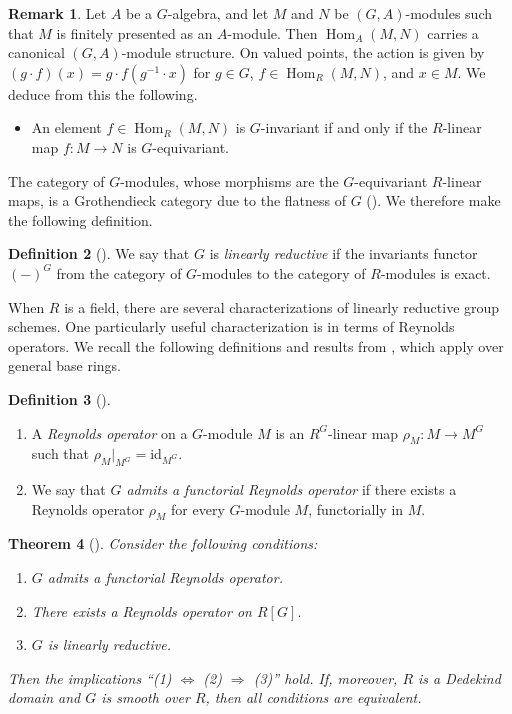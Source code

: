 \documentclass[uplatex,11pt,a4paper]{amsart} %
\numberwithin{equation}{section}
\numberwithin{figure}{section}
\numberwithin{table}{section}
\theoremstyle{plain}
\newtheorem{theorem}{Theorem}[section]
\theoremstyle{definition}
\newtheorem{definition}[theorem]{Definition}
\newtheorem{remark}[theorem]{Remark}
\newcommand{\id}{\mathrm{id}}
\DeclareMathOperator{\Hom}{Hom}
\begin{document}
\begin{remark}
\label{rem:HomG}
Let $A$ be a $G$-algebra, and let $M$ and $N$ be $(G,A)$-modules such that $M$ is finitely presented as an $A$-module.
Then $\Hom_A(M,N)$ carries a canonical $(G,A)$-module structure. On valued points, the action is given by $(g\cdot f)(x)=g\cdot f(g^{-1}\cdot x)$ for $g\in G$, $f\in\Hom_R(M,N)$, and $x\in M$. We deduce from this the following.
  \begin{itemize}
  \item An element $f\in\Hom_R(M,N)$ is $G$-invariant if and only if the $R$-linear map $f\colon M\to N$ is $G$-equivariant.
  \end{itemize}
\end{remark}

The category of $G$-modules, whose morphisms are the $G$-equivariant $R$-linear maps, is a Grothendieck category due to the flatness of $G$ (\cite[Corollary 5.3.11]{Has}). We therefore make the following definition.

\begin{definition}[{\cite[Definition 3.1]{Wan25}}]
We say that $G$ is \emph{linearly reductive} if the invariants functor $(-)^G$ from the category of $G$-modules to the category of $R$-modules is exact.
\end{definition}

When $R$ is a field, there are several characterizations of linearly reductive group schemes.
One particularly useful characterization is in terms of Reynolds operators. We recall the following definitions and results from \cite{Wan25}, which apply over general base rings.

\begin{definition}[{\cite[Definition 3.3]{Wan25}}]
\label{def:Reynolds}
  \begin{enumerate}
  \item A \emph{Reynolds operator} on a $G$-module $M$ is an $R^G$-linear map $\rho_M\colon M\to M^G$ such that $\rho_M|_{M^G}=\id_{M^G}$.
  \item We say that \emph{$G$ admits a functorial Reynolds operator} if there exists a Reynolds operator $\rho_M$ for every $G$-module $M$, functorially in $M$.
  \end{enumerate}
\end{definition}

\begin{theorem}[{\cite[Propositions 3.4 and 3.6, Theorem 3.8]{Wan25}}]
\label{thm:Reynolds}
Consider the following conditions:
\begin{enumerate}
\item $G$ admits a functorial Reynolds operator.
\item There exists a Reynolds operator on $R[G]$.
\item $G$ is linearly reductive.
\end{enumerate}
Then the implications ``\textup{(1)} $\Leftrightarrow$ \textup{(2)} $\Rightarrow$ \textup{(3)}'' hold. If, moreover, $R$ is a Dedekind domain and $G$ is smooth over $R$, then all conditions are equivalent.
\end{theorem}
\end{document}
